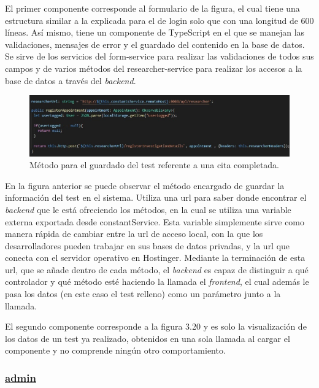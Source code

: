     El primer componente corresponde al formulario de la figura, el cual tiene una estructura similar a la explicada para el de login solo que con una longitud de 600 líneas. Así mismo, tiene un componente de TypeScript en el que se manejan las validaciones, mensajes de error y el guardado del contenido en la base de datos. Se sirve de los servicios del form-service para realizar las validaciones de todos sus campos y de varios métodos del researcher-service para realizar los accesos a la base de datos a través del \textit{backend}.
    
    \begin{figure}[h]
    \centering
    \includegraphics[width=1\textwidth]{images/registerAppointment.jpg}
    \caption{Método para el guardado del test referente a una cita completada.}
    \end{figure}
    \FloatBarrier
    
    En la figura anterior se puede observar el método encargado de guardar la información del test en el sistema. Utiliza una url para saber donde encontrar el \textit{backend} que le está ofreciendo los métodos, en la cual se utiliza una variable externa exportada desde constantService. Esta variable simplemente sirve como manera rápida de cambiar entre la url de acceso local, con la que los desarrolladores pueden trabajar en sus bases de datos privadas, y la url que conecta con el servidor operativo en Hostinger. Mediante la terminación de esta url, que se añade dentro de cada método, el \textit{backend} es capaz de distinguir a qué controlador y qué método esté haciendo la llamada el \textit{frontend}, el cual además le pasa los datos (en este caso el test relleno) como un parámetro junto a la llamada.\newline
    
    El segundo componente corresponde a la figura 3.20 y es solo la visualización de los datos de un test ya realizado, obtenidos en una sola llamada al cargar el componente y no comprende ningún otro comportamiento.\newpage
    
    \subsubsection{\underline{admin}}
    
